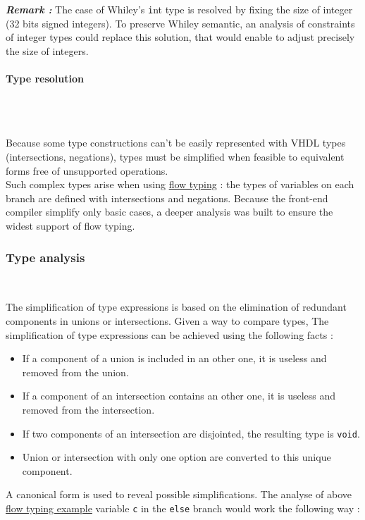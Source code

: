 \documentclass[10pt,a4paper]{article}
\newcommand{\code}{\texttt}
\renewcommand{\indent}{~\\\vspace{-.8cm}}
\newcommand{\pindent}{~\\\indent}
\newcommand{\whileyLine}{\lstinline[language=Whiley,basicstyle=\normalsize\ttfamily]}
\begin{document}
\textbf{\textsl{Remark :}} The case of Whiley's \code int type is resolved by fixing the size of integer (32 bits signed integers). To preserve Whiley semantic, an analysis of constraints of integer types could replace this solution, that would enable to adjust precisely the size of integers\cite{pearce2015integer}.




\paragraph{Type resolution}\pindent

Because some type constructions can't be easily represented with VHDL types (intersections, negations), types must be simplified when feasible to equivalent forms free of unsupported operations. \\

Such complex types arise when using \hyperref[FlowTE]{flow typing} : the types of variables on each branch are defined with intersections and negations. Because the front-end compiler simplify only basic cases, a deeper analysis was built to ensure the widest support of flow typing.


\subsubsection{Type analysis}
\indent

The simplification of type expressions is based on the elimination of redundant components in unions or intersections. Given a way to compare types, The simplification of type expressions can be achieved using the following facts :

\begin{itemize}
	\item If a component of a union is included in an other one, it is useless and removed from the union.
	\item If a component of an intersection contains an other one, it is useless and removed from the intersection.
	\item If two components of an intersection are disjointed, the resulting type is \whileyLine{void}.
	\item Union or intersection with only one option are converted to this unique component.
\end{itemize}

A canonical form is used to reveal possible simplifications. The analyse of above \hyperref[FlowTEC]{flow typing example} variable \whileyLine {c} in the \whileyLine {else} branch would work the following way :
\end{document}

